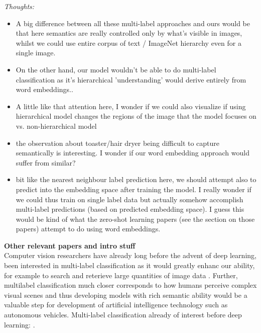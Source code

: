 \documentclass{report}
\begin{document}
\textit{Thoughts:}
\begin{itemize}
    \item A big difference between all these multi-label approaches and ours would be that here semantics are really controlled only by what's visible in images, whilst we could use entire corpus of text / ImageNet hierarchy even for a single image.
    \item On the other hand, our model wouldn't be able to do multi-label classification as it's hierarchical 'understanding' would derive entirely from word embeddings..
    \item A little like that attention here, I wonder if we could also visualize if using hierarchical model changes the regions of the image that the model focuses on vs. non-hierarchical model
    \item the observation about toaster/hair dryer being difficult to capture semantically is interesting. I wonder if our word embedding approach would suffer from similar? 
    \item bit like the nearest neighbour label prediction here, we should attempt also to predict into the embedding space after training the model. I really wonder if we could thus train on single label data but actually somehow accomplish multi-label predictions (based on predicted embedding space). I guess this would be kind of what the zero-shot learning papers (see the section on those papers) attempt to do using word embeddings. 
  \end{itemize}



\newpage
\textbf{Other relevant papers and intro stuff} \\
Computer vision researchers have already long before the advent of deep learning, been interested in multi-label classification as it would greatly enhanc our ability, for example to search and reterieve large quantities of image data \cite{MakadiaBaseline}. Further, multilabel classification much closer corresponds to how humans perceive complex visual scenes and thus developing models with rich semantic ability would be a valuable step for development of artificial intelligence technology such as autonomous vehicles. Multi-label classification already of interest before deep learning: \cite{tagprop}.  \\
\end{document}

